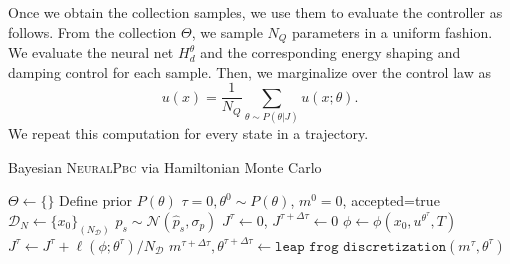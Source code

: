 \begin{enumerate}
    Once we obtain the collection samples, we use them to evaluate the
    controller as follows.
    From the collection $\Theta$, we sample $N_Q$ parameters in a uniform
    fashion.
    We evaluate the neural net $H^\theta_d$ and the corresponding energy shaping
    and damping control for each sample.
    Then, we marginalize over the control law as 
    \begin{equation*}
        u(x) = \frac{1}{N_Q} \sum_{\theta \sim P(\theta | J)} u(x; \theta).
    \end{equation*} 
    We repeat this computation for every state in a trajectory.

    \begin{algorithm}[H]
        \centering
        \caption{Bayesian \textsc{NeuralPbc} via Hamiltonian Monte Carlo}\label{algo:hmc}
        \begin{algorithmic}[1]
        \State $\Theta \leftarrow \{\}$ 
        \State Define prior $P(\theta)$
            \State $\tau=0, \theta^{0} \sim P(\theta)$, $m^0 = 0$, accepted=true
                \State $\mathcal{D}_N \gets \{x_0\}_{(N_{\mathcal{D}})}$             
                \State $p_s \sim \mathcal{N}(\hat{p}_s, \sigma_p)$
                \State $J^\tau \leftarrow 0$,  $J^{\tau + \Delta \tau} \leftarrow 0$
                    \State $\phi \leftarrow \phi(x_0, u^{\theta^{\tau}}, T) $
                    \State $J^\tau  \gets J^\tau  + \ell(\phi; \theta^{\tau})/N_{\mathcal{D}}$ 
                \EndFor
                \State $m^{\tau + \Delta \tau}, \theta ^{\tau + \Delta \tau} \leftarrow \texttt{leap frog discretization}(m^{\tau}, \theta ^{\tau} )$

\end{algorithmic}
\end{algorithm}
\end{enumerate}
